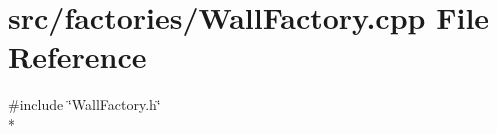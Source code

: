 \section{src/factories/\-Wall\-Factory.cpp File Reference}
\label{_wall_factory_8cpp}
{\ttfamily \#include \char`\"{}Wall\-Factory.\-h\char`\"{}}\\*
